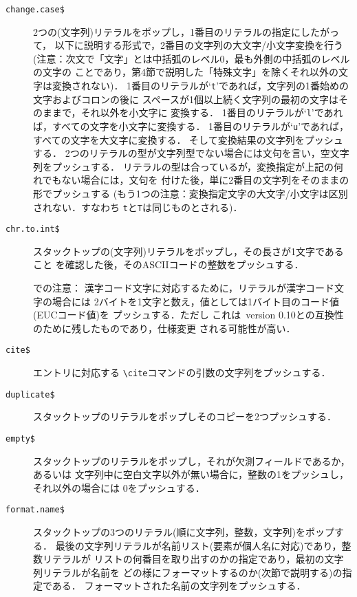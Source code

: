 \begin{description}
\item[\hbox{\tt change.case\$}\hfill]
2つの(文字列)リテラルをポップし，1番目のリテラルの指定にしたがって，
以下に説明する形式で，2番目の文字列の大文字/小文字変換を行う
(注意：次文で「文字」とは中括弧のレベル0，最も外側の中括弧のレベルの文字の
ことであり，第4節で説明した「特殊文字」を除くそれ以外の文字は変換されない)．
1番目のリテラルが`{\tt t}'であれば，文字列の1番始めの文字およびコロンの後に
スペースが1個以上続く文字列の最初の文字はそのままで，それ以外を小文字に
変換する．
1番目のリテラルが`{\tt l}'であれば，すべての文字を小文字に変換する．
1番目のリテラルが`{\tt u}'であれば，すべての文字を大文字に変換する．
そして変換結果の文字列をプッシュする．
2つのリテラルの型が文字列型でない場合には文句を言い，空文字列をプッシュする．
リテラルの型は合っているが，変換指定が上記の何れでもない場合には，文句を
付けた後，単に2番目の文字列をそのままの形でプッシュする
(もう1つの注意：変換指定文字の大文字/小文字は区別されない．すなわち
{\tt t}と{\tt T}は同じものとされる)．

\item[\hbox{\tt chr.to.int\$}\hfill]
スタックトップの(文字列)リテラルをポップし，その長さが1文字であること
を確認した後，そのASCIIコードの整数をプッシュする．

{\dg \JBibTeX での注意}：
漢字コード文字に対応するために，リテラルが漢字コード文字の場合には
2バイトを1文字と数え，値としては1バイト目のコード値(EUCコード値)を
プッシュする．ただし
これは\JBibTeX\ version 0.10との互換性のために残したものであり，仕様変更
される可能性が高い．

\item[\hbox{\tt cite\$}\hfill]
エントリに対応する {\verb|\cite|}コマンドの引数の文字列をプッシュする．

\item[\hbox{\tt duplicate\$}\hfill]
スタックトップのリテラルをポップしそのコピーを2つプッシュする．

\item[\hbox{\tt empty\$}\hfill]
スタックトップのリテラルをポップし，それが欠測フィールドであるか，あるいは
文字列中に空白文字以外が無い場合に，整数の1をプッシュし，それ以外の場合には
0をプッシュする．

\item[\hbox{\tt format.name\$}\hfill]
スタックトップの3つのリテラル(順に文字列，整数，文字列)をポップする．
最後の文字列リテラルが名前リスト(要素が個人名に対応)であり，整数リテラルが
リストの何番目を取り出すのかの指定であり，最初の文字列リテラルが名前を
どの様にフォーマットするのか(次節で説明する)の指定である．
フォーマットされた名前の文字列をプッシュする．


\end{description}
